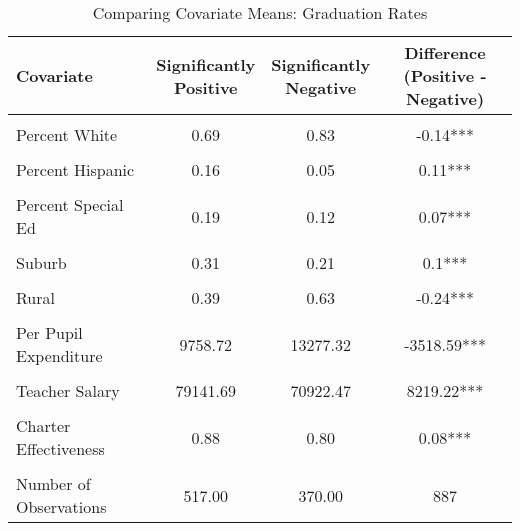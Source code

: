 \begin{table}[H]%
\centering
\caption{\label{tab:cov_means_afgr}Comparing Covariate Means: Graduation Rates}
\centering
\begin{tabular}[t]{lccc}
\toprule
Covariate & \makecell[c]{Significantly\\Positive} & \makecell[c]{Significantly\\Negative} & \makecell[c]{Difference\\(Positive - Negative)}\\
\midrule
\cellcolor{gray!10}{Log of Enrollment} & \cellcolor{gray!10}{7.82} & \cellcolor{gray!10}{6.96} & \cellcolor{gray!10}{0.86***}\\
Percent White & 0.69 & 0.83 & -0.14***\\
\cellcolor{gray!10}{Percent Black} & \cellcolor{gray!10}{0.08} & \cellcolor{gray!10}{0.09} & \cellcolor{gray!10}{-0.01}\\
Percent Hispanic & 0.16 & 0.05 & 0.11***\\
\cellcolor{gray!10}{Percent Free/Reduced Lunch} & \cellcolor{gray!10}{0.28} & \cellcolor{gray!10}{0.33} & \cellcolor{gray!10}{-0.05***}\\
Percent Special Ed & 0.19 & 0.12 & 0.07***\\
\cellcolor{gray!10}{Urban} & \cellcolor{gray!10}{0.16} & \cellcolor{gray!10}{0.05} & \cellcolor{gray!10}{0.11***}\\
Suburb & 0.31 & 0.21 & 0.1***\\
\cellcolor{gray!10}{Town} & \cellcolor{gray!10}{0.14} & \cellcolor{gray!10}{0.11} & \cellcolor{gray!10}{0.03}\\
Rural & 0.39 & 0.63 & -0.24***\\
\cellcolor{gray!10}{Per Pupil Revenue} & \cellcolor{gray!10}{9625.93} & \cellcolor{gray!10}{12778.85} & \cellcolor{gray!10}{-3152.92***}\\
Per Pupil Expenditure & 9758.72 & 13277.32 & -3518.59***\\
\cellcolor{gray!10}{Student-Teacher Ratio} & \cellcolor{gray!10}{15.88} & \cellcolor{gray!10}{14.17} & \cellcolor{gray!10}{1.71***}\\
Teacher Salary & 79141.69 & 70922.47 & 8219.22***\\
\cellcolor{gray!10}{Number of Magnet Schools} & \cellcolor{gray!10}{0.13} & \cellcolor{gray!10}{0.02} & \cellcolor{gray!10}{0.11**}\\
Charter Effectiveness & 0.88 & 0.80 & 0.08***\\
\cellcolor{gray!10}{Baseline Performance} & \cellcolor{gray!10}{0.79} & \cellcolor{gray!10}{0.80} & \cellcolor{gray!10}{-0.01}\\
\midrule
Number of Observations & 517.00 & 370.00 & 887\\
\bottomrule
\end{tabular}
\end{table}
